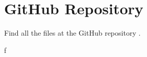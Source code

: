 \documentclass[letterpaper,10pt,english,openany,oneside]{sphinxmanual}
\begin{document}
\section{GitHub Repository}
\label{\detokenize{index:github-repository}}
Find all the files at the GitHub repository .


\renewcommand{\indexname}{Python Module Index}
\begin{sphinxtheindex}
\def\bigletter#1{{\Large\sffamily#1}\nopagebreak\vspace{1mm}}
\bigletter{f}
\item {}
\end{sphinxtheindex}

\renewcommand{\indexname}{Index}
\printindex
\end{document}
